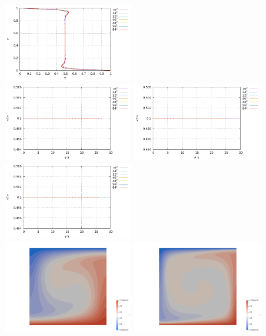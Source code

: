 \begin{center}
\includegraphics[width=5.7cm]{python_codes/fieldstone_110/results_BA/T_profile_Ra1e6.pdf}\\
\includegraphics[width=5.7cm]{python_codes/fieldstone_110/results_BA/T_avrg_Ra1e4.pdf}
\includegraphics[width=5.7cm]{python_codes/fieldstone_110/results_BA/T_avrg_Ra1e5.pdf}
\includegraphics[width=5.7cm]{python_codes/fieldstone_110/results_BA/T_avrg_Ra1e6.pdf}\\
\includegraphics[width=5.7cm]{python_codes/fieldstone_110/results_BA/T_Ra1e4.png}
\includegraphics[width=5.7cm]{python_codes/fieldstone_110/results_BA/T_Ra1e5.png}

\end{center}

